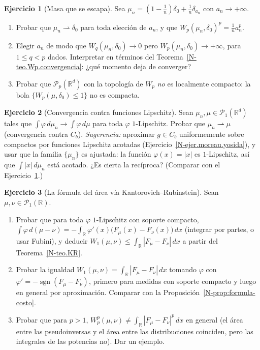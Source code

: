 \documentclass[11pt,a4paper]{amsart}
\newcounter{chapter}
\newcommand{\R}{{\mathbb R}}
\theoremstyle{remark}
\theoremstyle{definition}
\newtheorem{ejercicio}{Ejercicio}[chapter]
\numberwithin{subsection}{section}
\numberwithin{equation}{section}
\begin{document}
\begin{ejercicio}[Masa que se escapa]\label{ejer.Wp.escape}
Sea $\mu_n=(1-\frac1n)\delta_0+\frac1n\delta_{a_n}$ con $a_n\to+\infty$.
\begin{enumerate}[label=(\alph*)]
\item Probar que $\mu_n\rightharpoonup\delta_0$ para toda elección de
$a_n$, y que $W_p(\mu_n,\delta_0)^p=\frac1na_n^p$.
\item Elegir $a_n$ de modo que $W_q(\mu_n,\delta_0)\to0$ pero
$W_p(\mu_n,\delta_0)\to+\infty$, para $1\le q<p$ dados. Interpretar en
términos del Teorema~\ref{N-teo.Wp.convergencia}: ¿qué momento deja de
converger?
\item Probar que $\mathcal P_p(\R^d)$ con la topología de $W_p$ \emph{no} es
localmente compacto: la bola $\{W_p(\mu,\delta_0)\le1\}$ no es compacta.
\end{enumerate}
\end{ejercicio}

\begin{ejercicio}[Convergencia contra funciones Lipschitz]\label{ejer.Wp.lipschitz}
Sean $\mu_n,\mu\in\mathcal P_1(\R^d)$ tales que
$\int\varphi\,d\mu_n\to\int\varphi\,d\mu$ para toda $\varphi$ $1$-Lipschitz.
Probar que $\mu_n\rightharpoonup\mu$ (convergencia contra $C_b$).
\emph{Sugerencia:} aproximar $g\in C_b$ uniformemente sobre compactos por
funciones Lipschitz acotadas (Ejercicio~\ref{N-ejer.moreau.yosida}), y usar
que la familia $\{\mu_n\}$ es ajustada: la función $\varphi(x)=|x|$ es
$1$-Lipschitz, así que $\int|x|\,d\mu_n$ está acotado.
¿Es cierta la recíproca? (Comparar con el Ejercicio~\ref{ejer.Wp.escape}.)
\end{ejercicio}

\begin{ejercicio}[La fórmula del área vía Kantorovich--Rubinstein]\label{ejer.KR.area}
Sean $\mu,\nu\in\mathcal P_1(\R)$.
\begin{enumerate}[label=(\alph*)]
\item Probar que para toda $\varphi$ $1$-Lipschitz con soporte compacto,
$\int\varphi\,d(\mu-\nu)=-\int_\R\varphi'(x)\bigl(F_\mu(x)-F_\nu(x)\bigr)\,dx$
(integrar por partes, o usar Fubini), y deducir
$W_1(\mu,\nu)\le\int_\R|F_\mu-F_\nu|\,dx$ a partir del
Teorema~\ref{N-teo.KR}.
\item Probar la igualdad $W_1(\mu,\nu)=\int_\R|F_\mu-F_\nu|\,dx$ tomando
$\varphi$ con $\varphi'=-\operatorname{sgn}(F_\mu-F_\nu)$, primero para
medidas con soporte compacto y luego en general por aproximación. Comparar
con la Proposición~\ref{N-prop:formula-costo}.
\item Probar que para $p>1$, $W_p^p(\mu,\nu)\ne\int_\R|F_\mu-F_\nu|^p\,dx$ en
general (el área entre las pseudoinversas y el área entre las distribuciones
coinciden, pero las integrales de las potencias no). Dar un ejemplo.
\end{enumerate}
\end{ejercicio}
\end{document}
